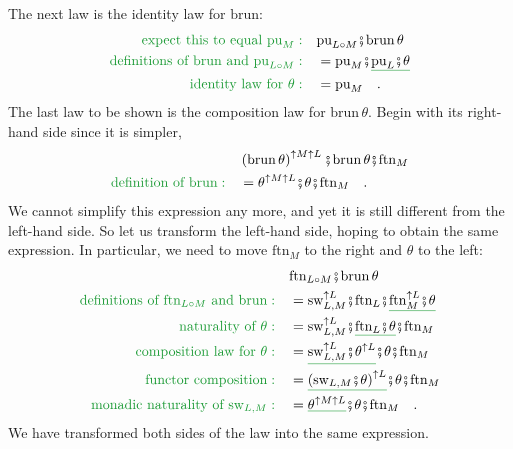 The next law is the identity law for $\text{brun}$:
\begin{align*}
{\color{greenunder}\text{expect this to equal }\text{pu}_{M}:}\quad & \text{pu}_{L\circ M}\bef\text{brun}\,\theta\\
{\color{greenunder}\text{definitions of }\text{brun}\text{ and }\text{pu}_{L\circ M}:}\quad & =\text{pu}_{M}\bef\gunderline{\text{pu}_{L}\bef\theta}\\
{\color{greenunder}\text{identity law for }\theta:}\quad & =\text{pu}_{M}\quad.
\end{align*}
The last law to be shown is the composition law for $\text{brun}\,\theta$.
Begin with its right-hand side since it is simpler,
\begin{align*}
 & \left(\text{brun}\,\theta\right)^{\uparrow M\uparrow L}\bef\text{brun}\,\theta\bef\text{ftn}_{M}\\
{\color{greenunder}\text{definition of }\text{brun}:}\quad & =\theta^{\uparrow M\uparrow L}\bef\theta\bef\text{ftn}_{M}\quad.
\end{align*}
We cannot simplify this expression any more, and yet it is still different
from the left-hand side. So let us transform the left-hand side, hoping
to obtain the same expression. In particular, we need to move $\text{ftn}_{M}$
to the right and $\theta$ to the left: 
\begin{align*}
 & \text{ftn}_{L\circ M}\bef\text{brun}\,\theta\\
{\color{greenunder}\text{definitions of }\text{ftn}_{L\circ M}\text{ and }\text{brun}:}\quad & =\text{sw}_{L,M}^{\uparrow L}\bef\text{ftn}_{L}\bef\gunderline{\text{ftn}_{M}^{\uparrow L}\bef\theta}\\
{\color{greenunder}\text{naturality of }\theta:}\quad & =\text{sw}_{L,M}^{\uparrow L}\bef\gunderline{\text{ftn}_{L}\bef\theta}\bef\text{ftn}_{M}\\
{\color{greenunder}\text{composition law for }\theta:}\quad & =\gunderline{\text{sw}_{L,M}^{\uparrow L}\bef\theta^{\uparrow L}}\bef\theta\bef\text{ftn}_{M}\\
{\color{greenunder}\text{functor composition}:}\quad & =\gunderline{\left(\text{sw}_{L,M}\bef\theta\right)^{\uparrow L}}\bef\theta\bef\text{ftn}_{M}\\
{\color{greenunder}\text{monadic naturality of }\text{sw}_{L,M}:}\quad & =\gunderline{\theta^{\uparrow M\uparrow L}}\bef\theta\bef\text{ftn}_{M}\quad.
\end{align*}
We have transformed both sides of the law into the same expression.

